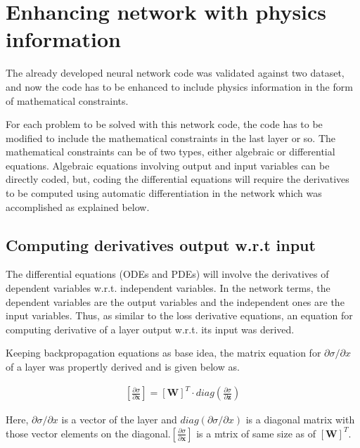 \section{Enhancing network with physics information}
\par{}
The already developed neural network code was validated against two dataset,
and now the code has to be enhanced to include physics information in the form
of mathematical constraints.\\

\par{}
For each problem to be solved with this network code, the code has to be
modified to include the mathematical constraints in the last layer or so. The
mathematical constraints can be of two types, either algebraic or differential
equations. Algebraic equations involving output and input variables can be
directly coded, but, coding the differential equations will require the
derivatives to be computed using automatic differentiation in the network which
was accomplished as explained below.\\

\subsection{Computing derivatives output w.r.t input}
\par{}
The differential equations (ODEs and PDEs) will involve the
derivatives of dependent variables w.r.t. independent variables. In the
network terms, the dependent variables are the output variables and the
independent ones are the input variables. Thus, as similar to the loss derivative
equations, an equation for computing derivative of a layer output w.r.t. its
input was derived. \\

\par{}
Keeping backpropagation equations as base idea, the matrix equation for
\(\partial \sigma/\partial x\) of a layer was propertly derived and is given
below as.

\begin{align}
    \left[\frac{\partial \sigma}{\partial \bm{x}}\right] = \left[\bm{W}\right]^T \cdot diag\left(\frac{\partial \sigma}{\partial \bm{z}}\right) \label{differential_matrix_eqn}
\end{align}

\par{}
Here, \(\partial \sigma/\partial x\) is a vector of the layer and
\(diag\left(\partial \sigma/\partial x\right)\) is a diagonal matrix with those
vector elements on the diagonal.\(\left[\frac{\partial \sigma}{\partial
\bm{x}}\right] \) is a mtrix of same size as of \(\left[\bm{W}\right]^T\). \\

